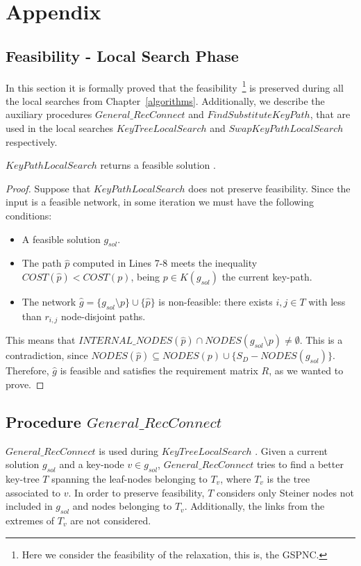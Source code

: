 \chapter{Appendix}\label{appendix}

\section{Feasibility - Local Search Phase}
In this section it is formally proved that the feasibility~\footnote{Here we consider the feasibility of the relaxation, 
this is, the GSPNC.} is preserved during 
all the local searches from Chapter~\ref{algorithms}. Additionally, we describe 
the auxiliary procedures $General\_RecConnect$ and $FindSubstituteKeyPath$, that are used in 
the local searches $KeyTreeLocalSearch$ and $SwapKeyPathLocalSearch$ respectively.

\begin{proposition}
$KeyPathLocalSearch$ returns a feasible solution \cite{11}.
\end{proposition}
\begin{proof}
Suppose that $KeyPathLocalSearch$ does not preserve feasibility. Since the input is a 
feasible network, in some iteration we must have the following conditions:
\begin{itemize}
\item A feasible solution $g_{sol}$.
\item The path $\hat{p}$ computed in Lines 7-8 meets the inequality 
$COST(\hat{p}) < COST(p)$, being $p \in K(g_{sol})$ the current key-path. 
\item The network $\hat{g} = \{g_{sol}\setminus p \} \cup \{ \hat{p}\}$ is non-feasible: 
there exists $i,j \in T$ with less than $r_{i,j}$ node-disjoint paths. 
\end{itemize}
This means that $INTERNAL\_NODES(\hat{p}) \cap NODES(g_{sol}\setminus p) \neq \emptyset$. This is a contradiction, since $NODES(\hat{p}) \subseteq NODES(p) \cup \{S_D - NODES(g_{sol})\} $. Therefore, $\hat{g}$ is feasible and satisfies the requirement matrix $R$, as we wanted to prove.  
\end{proof}

\section*{Procedure $General\_RecConnect$}
$General\_RecConnect$ is used during $KeyTreeLocalSearch$ \cite{11}. Given a current solution $g_{sol}$ 
and a key-node $v \in g_{sol}$, $General\_RecConnect$ tries to find a better key-tree $T$ 
spanning the leaf-nodes belonging to $T_v$, where $T_v$ is the tree associated to $v$. In 
order to preserve feasibility, $T$ considers only Steiner nodes not included in $g_{sol}$ and nodes belonging to $T_v$. Additionally, the links from the extremes of $T_v$ are not considered. 

